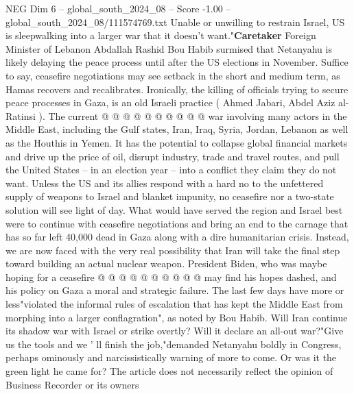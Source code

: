 \begin{textsample}{NEG Dim 6 – global\_south\_2024\_08 – Score -1.00 – global\_south\_2024\_08/111574769.txt}
Unable or unwilling to restrain Israel, US is sleepwalking into a larger war that it doesn't want."\textbf{Caretaker} Foreign Minister of Lebanon Abdallah Rashid Bou Habib surmised that Netanyahu is likely delaying the peace process until after the US elections in November.
Suffice to say, ceasefire negotiations may see setback in the short and medium term, as Hamas recovers and recalibrates.
Ironically, the killing of officials trying to secure peace processes in Gaza, is an old Israeli practice ( Ahmed Jabari, Abdel Aziz al-Ratinsi ).
The current @ @ @ @ @ @ @ @ @ @ war involving many actors in the Middle East, including the Gulf states, Iran, Iraq, Syria, Jordan, Lebanon as well as the Houthis in Yemen.
It has the potential to collapse global financial markets and drive up the price of oil, disrupt industry, trade and travel routes, and pull the United States -- in an election year -- into a conflict they claim they do not want.
Unless the US and its allies respond with a hard no to the unfettered supply of weapons to Israel and blanket impunity, no ceasefire nor a two-state solution will see light of day.
What would have served the region and Israel best were to continue with ceasefire negotiations and bring an end to the carnage that has so far left 40,000 dead in Gaza along with a dire humanitarian crisis.
Instead, we are now faced with the very real possibility that Iran will take the final step toward building an actual nuclear weapon.
President Biden, who was maybe hoping for a ceasefire @ @ @ @ @ @ @ @ @ @ may find his hopes dashed, and his policy on Gaza a moral and strategic failure.
The last few days have more or less"violated the informal rules of escalation that has kept the Middle East from morphing into a larger conflagration", as noted by Bou Habib.
Will Iran continue its shadow war with Israel or strike overtly?
Will it declare an all-out war?"Give us the tools and we ' ll finish the job,"demanded Netanyahu boldly in Congress, perhaps ominously and narcissistically warning of more to come.
Or was it the green light he came for?
The article does not necessarily reflect the opinion of Business Recorder or its owners

\end{textsample}
